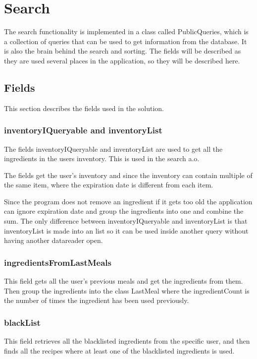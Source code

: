 \chapter{Search}\label{chp:PublicQuerys}
The search functionality is implemented in a class called PublicQueries, which is a collection of queries that can be used to get information from the database. It is also the brain behind the search and sorting.
The fields will be described as they are used several places in the application, so they will be described here.

\section{Fields}
This section describes the fields used in the solution.
\subsection{inventoryIQueryable and inventoryList}
The fields inventoryIQueryable and inventoryList are used to get all the ingredients in the users inventory. This is used in the search a.o.

The fields get the user's inventory and since the inventory can contain multiple of the same item, where the expiration date is different from each item.

Since the program does not remove an ingredient if it gets too old the application can ignore expiration date and group the ingredients into one and combine the sum. The only difference between inventoryIQueryable and inventoryList is that inventoryList is made into an list so it can be used inside another query without having another datareader open.

\subsection{ingredientsFromLastMeals}
This field gets all the user's previous meals and get the ingredients from them. Then group the ingredients into the class LastMeal where the ingredientCount is the number of times the ingredient has been used previously.

\subsection{blackList} \label{ssc:blacklist}

This field retrieves all the blacklisted ingredients from the specific user, and then finds all the recipes where at least one of the blacklisted ingredients is used.

